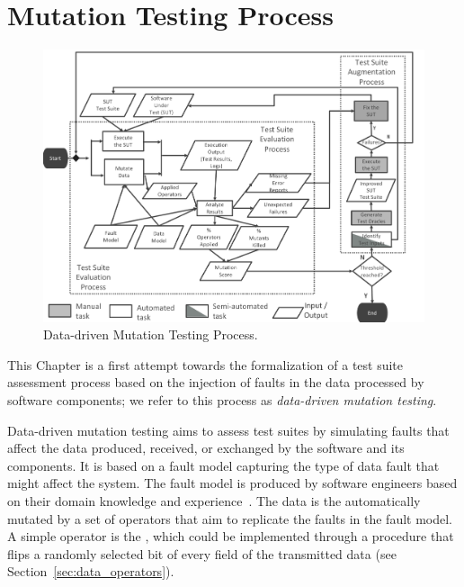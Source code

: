 
\section{Mutation Testing Process}
\label{sec:dataProcess}

	\begin{figure}
	\centering
		\includegraphics[width=\textwidth]{images/dataProcess}
		\caption{Data-driven Mutation Testing Process.}
		\label{fig:data:process}
	\end{figure}



This Chapter is a first attempt towards the formalization of a test suite assessment process based on the injection of faults in the data processed by software components; we refer to this process as \emph{data-driven mutation testing}. 

Data-driven mutation testing aims to assess test suites by simulating faults that affect the data produced, received, or exchanged by the software and its components.
It is based on a fault model capturing the type of data fault that might affect the system. The fault model is produced by software engineers based on their domain knowledge and experience~\cite{di2015generating}.  The data is the automatically mutated by a set of operators that aim to replicate the faults in the fault model. A simple operator is the , which could be implemented through a procedure that flips a randomly selected bit of every field of the transmitted data (see Section~\ref{sec:data_operators}).


